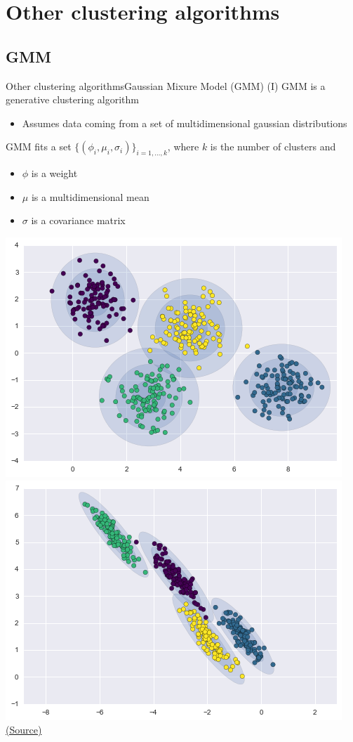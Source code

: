 \documentclass[10pt,compress]{beamer} %
\begin{document}
\section{Other clustering algorithms}

\subsection{GMM}

\begin{frame}{Other clustering algorithms}{Gaussian Mixure Model (GMM) (I)}
	GMM is a generative clustering algorithm
	\begin{itemize}
		\item Assumes data coming from a set of multidimensional gaussian distributions
	\end{itemize}

    GMM fits a set $\{(\phi_i, \mu_i, \sigma_i)\}_{i=1,\dots, k}$, where $k$ is the number of clusters and
	\begin{itemize}
			\item $\phi$ is a weight
			\item $\mu$ is a multidimensional mean
			\item $\sigma$ is a covariance matrix
	\end{itemize}

	\bigskip
	\centering \includegraphics[width=0.41\linewidth]{figs/gmm2.png}
	\includegraphics[width=0.41\linewidth]{figs/gmm3.png}\\
	\scriptsize\href{https://jakevdp.github.io/PythonDataScienceHandbook/05.12-gaussian-mixtures.html}{(Source)}
\end{frame}
\end{document}
